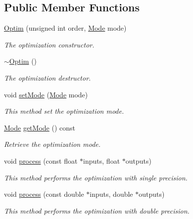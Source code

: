 \subsection*{Public Member Functions}
\begin{DoxyCompactItemize}
\item 
\hyperlink{class_hoa3_d_1_1_optim_ab53ffe61910a75637afafb7f4f3ba788}{Optim} (unsigned int order, \hyperlink{class_hoa3_d_1_1_optim_a1a153ac21e7a112279824f17981cf147}{Mode} mode)
\begin{DoxyCompactList}\small\item\em The optimization constructor. \end{DoxyCompactList}\item 
\hyperlink{class_hoa3_d_1_1_optim_a11c05a8b458f79ba09f4eefad63e0b20}{$\sim$\-Optim} ()
\begin{DoxyCompactList}\small\item\em The optimization destructor. \end{DoxyCompactList}\item 
void \hyperlink{class_hoa3_d_1_1_optim_abb49c9e6a327bc62ac6491cd3046a10a}{set\-Mode} (\hyperlink{class_hoa3_d_1_1_optim_a1a153ac21e7a112279824f17981cf147}{Mode} mode)
\begin{DoxyCompactList}\small\item\em This method set the optimization mode. \end{DoxyCompactList}\item 
\hyperlink{class_hoa3_d_1_1_optim_a1a153ac21e7a112279824f17981cf147}{Mode} \hyperlink{class_hoa3_d_1_1_optim_a0446c68d06a5fd112f3e608c82d69b7f}{get\-Mode} () const 
\begin{DoxyCompactList}\small\item\em Retrieve the optimization mode. \end{DoxyCompactList}\item 
void \hyperlink{class_hoa3_d_1_1_optim_a13f8cb746e5bcc3c096bd0c0bf1a6435}{process} (const float $\ast$inputs, float $\ast$outputs)
\begin{DoxyCompactList}\small\item\em This method performs the optimization with single precision. \end{DoxyCompactList}\item 
void \hyperlink{class_hoa3_d_1_1_optim_a6c2e7ce20ec5f98e9e609040144ea99d}{process} (const double $\ast$inputs, double $\ast$outputs)
\begin{DoxyCompactList}\small\item\em This method performs the optimization with double precision. \end{DoxyCompactList}\end{DoxyCompactItemize}


